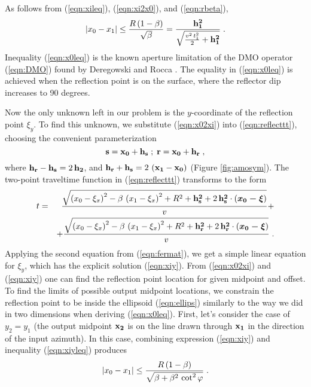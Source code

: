 As follows from (\ref{eqn:xileq}), (\ref{eqn:xi2x0}), and (\ref{eqn:rbeta}),
\begin{equation}
\left|x_0-x_1\right| \leq {R\,(1-\beta)\over \sqrt{\beta}}=
{{\bf h_1^2}\over \sqrt{{{v^2\,t_1^2}\over 2}+{\bf h_1^2}}}\;.
\label{eqn:x0leq}
\end{equation}
Inequality (\ref{eqn:x0leq}) is the known aperture limitation of the DMO
operator (\ref{eqn:DMO}) found by Deregowski and Rocca
. The equality in (\ref{eqn:x0leq}) is achieved 
when the reflection point is on the surface, where the reflector dip
increases to 90 degrees.
\par
Now the only unknown left in our problem is the $y$-coordinate of the
reflection point $\xi_y$. To find this unknown, we substitute
(\ref{eqn:x02xi}) into (\ref{eqn:reflecttt}), choosing the convenient
parameterization
\begin{equation}
{\bf s  =  x_0+ h_s\;;\; r  =   x_0+ h_r}\;, 
\label{eqn:x02sr}
\end{equation}
where ${\bf h_r-h_s}=2\,{\bf h_2}$, and ${\bf h_r+h_s}=2\ {\bf
\left(x_1-x_0\right)}$ (Figure \ref{fig:amosym}). The 
two-point traveltime function in (\ref{eqn:reflecttt}) transforms to the form
\begin{eqnarray}
t & = & {\sqrt{\left(x_0-\xi_x\right)^2-\beta\,\left(x_1-\xi_x\right)^2+R^2+
{\bf h_s^2}+2\,{\bf h_s^2}\cdot\left(\mbox{\boldmath{$x_0-\xi$}}\right)}
\over v}+
\nonumber \\
& & + {\sqrt{\left(x_0-\xi_x\right)^2-\beta\,\left(x_1-\xi_x\right)^2+R^2+
{\bf h_r^2}+2\,{\bf h_r^2}\cdot\left(\mbox{\boldmath{$x_0-\xi$}}\right)}
\over v}\;.
\label{eqn:reflectrt}
\end{eqnarray} 
Applying the second equation from (\ref{eqn:fermat}), we get a simple linear
equation for $\xi_y$, which has the explicit solution (\ref{eqn:xiy}).
From (\ref{eqn:x02xi}) and (\ref{eqn:xiy}) one can find the reflection
point location for given midpoint and offset. To find the limits of
possible output midpoint locations, we constrain the reflection
point to be inside the ellipsoid (\ref{eqn:ellips}) similarly to the way we did
in two dimensions when deriving (\ref{eqn:x0leq}). First, let's consider the
case of $y_2=y_1$ (the output midpoint ${\bf x_2}$ is on the line drawn
through ${\bf x_1}$ in the direction of the input azimuth). In this
case, combining expression (\ref{eqn:xiy}) and inequality (\ref{eqn:xiyleq})
produces
\begin{equation}
\left|x_0-x_1\right| \leq {R\,(1-\beta)\over 
\sqrt{\beta+\beta^2\,\cot^2{\varphi}}}\;.
\label{eqn:x0leq3D}
\end{equation}
